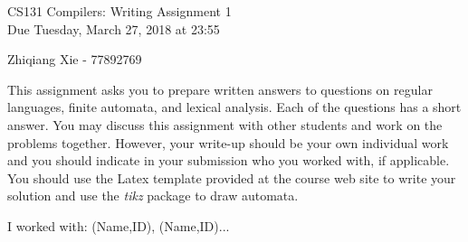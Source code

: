 \documentclass[10pt]{article}
\begin{document}
\begin{center}
\Large CS131 Compilers: Writing Assignment 1\\Due Tuesday, March 27, 2018 at 23:55
\end{center}

\begin{center}
\LARGE Zhiqiang Xie - 77892769
\end{center}


This assignment asks you to prepare written answers to questions on
regular languages, finite automata, and lexical analysis.  Each of the
questions has a short answer.  You may discuss this assignment with
other students and work on the problems together.  However, your
write-up should be your own individual work and you should indicate in your submission who you worked
with, if applicable. You should use the Latex template provided at the course web site to write your solution and use the \emph{tikz} package to draw
automata.

\begin{center}
I worked with: (Name,ID), (Name,ID)...
\end{center}
\end{document}
